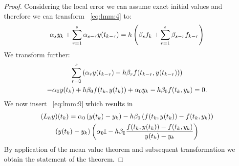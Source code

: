 \begin{proof}
  Considering the local error we can assume exact initial values 
  and therefore we can transform ~\ref{eq:lmm:4} to:
  \begin{gather*}
    \alpha_s y_k + \sum\limits_{r=1}^s \alpha_{s-r} y(t_{k-r})
    = h \left( \beta_s f_k + \sum\limits_{r=1}^s \beta_{s-r} f_{k-r} \right)
  \end{gather*}
  We transform further:
  \begin{multline*}
    \sum\limits_{r=0}^{s} \left( \alpha_r y(t_{k-r})
      - h \beta_r f(t_{k-r},y(t_{k-r})) \right)
    \\
    - \alpha_0 y(t_k) + h \beta_0 f(t_k, y(t_k)) + \alpha_0 y_k
    - h \beta_0 f(t_k,y_k) = 0.
  \end{multline*}
	We now insert ~\ref{eq:lmm:9} which results in
  \begin{gather*}
    (L_h y)(t_k) = \alpha_0 \left( y(t_k) - y_k \right) - h \beta_0 \left( f(t_k,y(t_k)) - f(t_k,y_k) \right)
    \\
    \left( y(t_k) - y_k \right) \left( \alpha_0 \mathbb I - h \beta_0 \frac{f(t_k,y(t_k)) - f(t_k,y_k)}{y(t_k) - y_k} \right)
  \end{gather*}
  By application of the mean value theorem and 
  subsequent transformation we obtain the statement of the theorem.
\end{proof}





